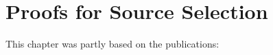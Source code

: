 \documentclass[11pt,a4paper,twoside]{book}
\newcommand\blankpage{%
    \null
    \thispagestyle{empty}%
    \addtocounter{page}{-1}%
    \newpage}
\begin{document}
\section{Proofs for Source Selection}\label{sec:sensdesc}



\clearpage
\newpage
This chapter was partly based on the publications:
\vspace{0.3cm}


\vspace{0.3cm}









% 
% 
%     



\begin{appendices}
%    

\end{appendices}


\backmatter


    
\end{document}
